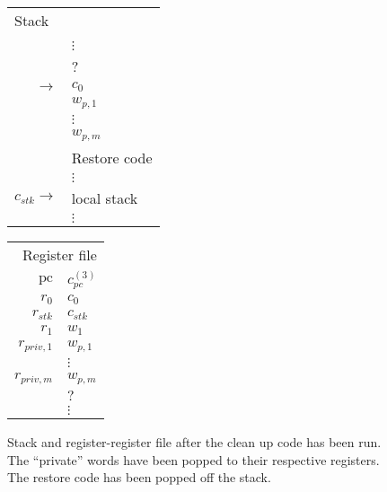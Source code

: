 \documentclass[a4paper]{article}
\newcommand{\var}[1]{\mathit{#1}}
\newcommand{\pc}{\mathit{pc}}
\newcommand{\pcreg}{\mathrm{pc}}
\newcommand{\stk}{\var{stk}}
\begin{document}
              \begin{figure}
                \label{fig:stack-after-restore-code}
                \centering
                \begin{tabular}[!h]{r | >{\raggedright\arraybackslash}p{3cm} |}
                  \multicolumn{2}{l}{Stack} \\
                  \cline{2-2}
               & \\
               & $\vdots$\\
                  \cline{2-2}
               & ? \\
                  \cline{2-2}
                  $ \rightarrow$  & $c_0$ \\
                  \cline{2-2}
               & $w_{p,1}$ \\
                  \cline{2-2}
               & $\vdots$ \\
                  \cline{2-2}
               & $w_{p,m}$ \\
                  \cline{2-2}
               & Restore code \\
               & $\vdots$\\
                  \cline{2-2}
                  $c_\stk \rightarrow$  & local stack\\
               & $\vdots$\\
                  \cline{2-2}
                \end{tabular}
                \hspace{1cm}
                \begin{tabular}{r | >{\centering\arraybackslash}p{0.75cm} |}
                  \multicolumn{2}{r}{Register file} \\
                  \cline{2-2}
                  $\pcreg$ & $c_\pc^{(3)}$\\
                  \cline{2-2}
                  $r_0$  &  $c_0$ \\
                  \cline{2-2}
                  $r_{\var{stk}}$  & $c_{\var{stk}}$ \\
                  \cline{2-2}
                  $r_1$ & $w_1$ \\
                  \cline{2-2}
                  $r_{\var{priv},1}$ & $w_{p,1}$\\
                  \cline{2-2}
                           & $\vdots$ \\
                  \cline{2-2}
                  $r_{\var{priv},m}$ & $w_{p,m}$ \\
                  \cline{2-2}
                           & $?$ \\
                  \cline{2-2}
                           & $\vdots$ \\
                  \cline{2-2}
                \end{tabular}
                \caption{ Stack and register-register file after the clean up code has been run. The ``private'' words have been popped to their respective registers. The restore code has been popped off the stack. }
              \end{figure}
\end{document}
